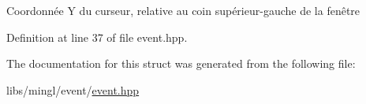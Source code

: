 Coordonnée Y du curseur, relative au coin supérieur-\/gauche de la fenêtre 

Definition at line 37 of file event.\+hpp.



The documentation for this struct was generated from the following file\+:\begin{DoxyCompactItemize}
\item 
libs/mingl/event/\hyperlink{event_8hpp}{event.\+hpp}\end{DoxyCompactItemize}
